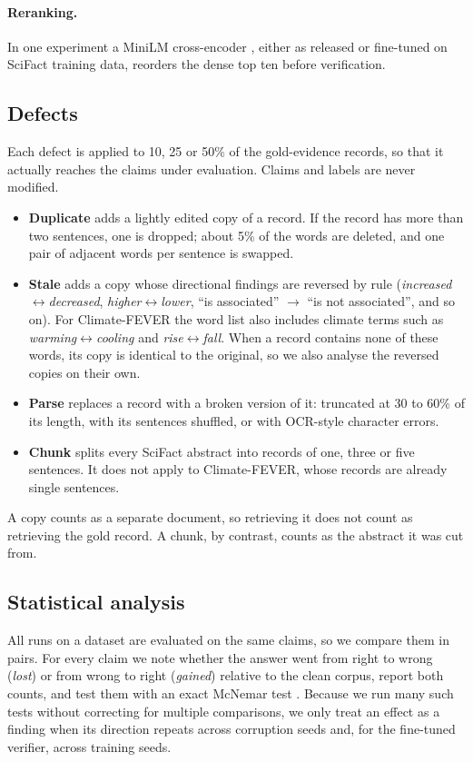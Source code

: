 \documentclass[11pt]{article}
\begin{document}
\paragraph{Reranking.} In one experiment a MiniLM cross-encoder \citep{nogueira2019rerank}, either as
released or fine-tuned on SciFact training data, reorders the dense top ten before verification.

\subsection{Defects}
Each defect is applied to 10, 25 or 50\% of the gold-evidence records, so that it actually reaches the
claims under evaluation. Claims and labels are never modified.
\begin{itemize}
\setlength\itemsep{0pt}
\item \textbf{Duplicate} adds a lightly edited copy of a record. If the record has more than two sentences,
  one is dropped; about 5\% of the words are deleted, and one pair of adjacent words per sentence is
  swapped.
\item \textbf{Stale} adds a copy whose directional findings are reversed by rule
  (\emph{increased}$\leftrightarrow$\emph{decreased}, \emph{higher}$\leftrightarrow$\emph{lower},
  ``is associated'' $\rightarrow$ ``is not associated'', and so on). For Climate-FEVER the word list also
  includes climate terms such as \emph{warming}$\leftrightarrow$\emph{cooling} and
  \emph{rise}$\leftrightarrow$\emph{fall}. When a record contains none of these words, its copy is
  identical to the original, so we also analyse the reversed copies on their own.
\item \textbf{Parse} replaces a record with a broken version of it: truncated at 30 to 60\% of its length,
  with its sentences shuffled, or with OCR-style character errors.
\item \textbf{Chunk} splits every SciFact abstract into records of one, three or five sentences. It does not
  apply to Climate-FEVER, whose records are already single sentences.
\end{itemize}
A copy counts as a separate document, so retrieving it does not count as retrieving the gold record. A
chunk, by contrast, counts as the abstract it was cut from.

\subsection{Statistical analysis}
All runs on a dataset are evaluated on the same claims, so we compare them in pairs. For every claim we
note whether the answer went from right to wrong (\emph{lost}) or from wrong to right (\emph{gained})
relative to the clean corpus, report both counts, and test them with an exact McNemar test
\citep{mcnemar1947}. Because we run many such tests without correcting for multiple comparisons, we
only treat an effect as a finding when its direction repeats across corruption seeds and, for the
fine-tuned verifier, across training seeds.
\end{document}
